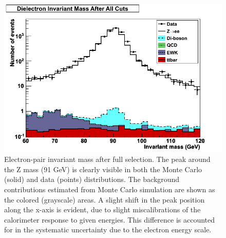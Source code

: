 


 \begin{figure}[htb]
  \begin{center}
    \includegraphics[width=360pt]{Figures/invMass-04Apr11.png}
  \end{center}
  \caption[Electron-pair invariant mass after full selection]
  {Electron-pair invariant mass after full selection.
    The peak around the Z mass (91 GeV) is clearly visible
    in both the Monte Carlo (solid) and data (points) distributions.
    The background contributions estimated from Monte Carlo simulation
    are shown as the colored (grayscale) areas.
    A slight shift in the peak position along the x-axis is
    evident, due to slight miscalibrations of
    the calorimeter response to given energies.
    This difference is accounted for in the
    systematic uncertainty due to the electron energy scale.
  }
  \label{fig:InvMass}
 \end{figure}



